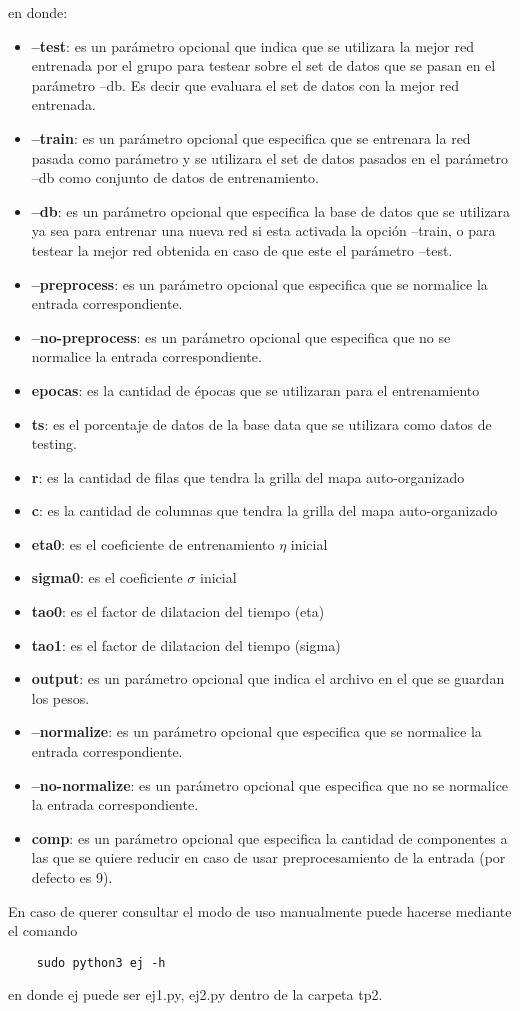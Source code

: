 en donde:
\begin{itemize}
  \item \textbf{--test}: es un parámetro opcional que indica que se utilizara la mejor red entrenada por el grupo para testear sobre el set de datos que se pasan en el parámetro
  --db. Es decir que evaluara el set de datos con la mejor red entrenada.
  \item \textbf{--train}: es un parámetro opcional que especifica que se entrenara la red pasada como parámetro y se utilizara el set de datos pasados en el parámetro --db
  como conjunto de datos de entrenamiento.
  \item \textbf{--db}: es un parámetro opcional que especifica la base de datos que se utilizara ya sea para entrenar una nueva red si esta activada la opción --train, o
  para testear la mejor red obtenida en caso de que este el parámetro --test.
  \item \textbf{--preprocess}: es un parámetro opcional que especifica que se normalice la entrada correspondiente.
  \item \textbf{--no-preprocess}: es un parámetro opcional que especifica que no se normalice la entrada correspondiente.
  \item \textbf{epocas}: es la cantidad de épocas que se utilizaran para el entrenamiento
  \item \textbf{ts}: es el porcentaje de datos de la base data que se utilizara como datos de testing.
  \item \textbf{r}: es la cantidad de filas que tendra la grilla del mapa auto-organizado
  \item \textbf{c}: es la cantidad de columnas que tendra la grilla del mapa auto-organizado
  \item \textbf{eta0}: es el coeficiente de entrenamiento $\eta$ inicial
  \item \textbf{sigma0}: es el coeficiente $\sigma$ inicial
  \item \textbf{tao0}: es el factor de dilatacion del tiempo (eta)
  \item \textbf{tao1}: es el factor de dilatacion del tiempo (sigma)
  \item \textbf{output}: es un parámetro opcional que indica el archivo en el que se guardan los pesos.
  \item \textbf{--normalize}: es un parámetro opcional que especifica que se normalice la entrada correspondiente.
  \item \textbf{--no-normalize}: es un parámetro opcional que especifica que no se normalice la entrada correspondiente.
  \item \textbf{comp}: es un parámetro opcional que especifica la cantidad de componentes a las que se quiere reducir en caso  de usar preprocesamiento de la entrada (por defecto es 9).

\end{itemize}

En caso de querer consultar el modo de uso manualmente puede hacerse mediante el comando
\begin{verbatim}
    sudo python3 ej -h
\end{verbatim}
en donde ej puede ser {ej1.py, ej2.py} dentro de la carpeta tp2.

\newpage

